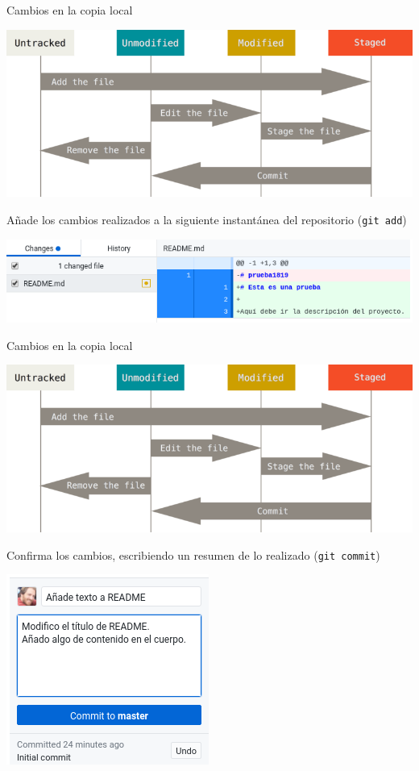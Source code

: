 \documentclass[aspectratio=169, xcolor={usenames,svgnames,dvipsnames}]{beamer}
\begin{document}
\begin{frame}[label={sec:orgf4d60d6},fragile]{Cambios en la copia local}
 \begin{center}
\includegraphics[height=0.4\textheight]{figs/git_estados.png}
\end{center}

\alert{Añade los cambios} realizados a la siguiente \guillemotleft{}instantánea\guillemotright{} del repositorio (\texttt{git add}) \begin{center}
\includegraphics[width=.9\linewidth]{figs/git_add.png}
\end{center}
\end{frame}
\begin{frame}[label={sec:org4e4f194},fragile]{Cambios en la copia local}
 \begin{center}
\includegraphics[height=0.4\textheight]{figs/git_estados.png}
\end{center}

\alert{Confirma} los cambios, escribiendo un resumen de lo realizado (\texttt{git commit})
\begin{center}
\includegraphics[height=0.3\textheight]{figs/git_commit.png}
\end{center}
\end{frame}
\end{document}
